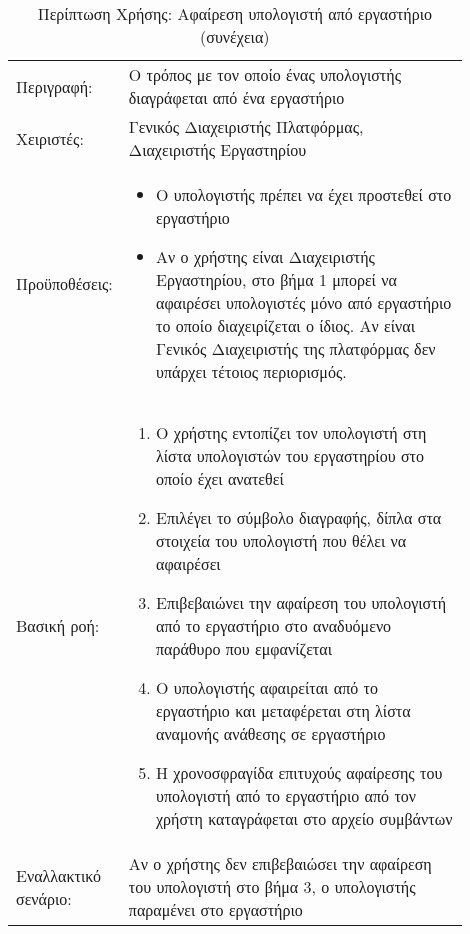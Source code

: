 %
%
\begin{longtable}{|p{0.14\linewidth}|p{0.76\linewidth}|}
	\caption{Περίπτωση Χρήσης: Αφαίρεση υπολογιστή από εργαστήριο} \label{tab:use-case-delete-computer-from-lab} \\ \hline \endfirsthead
	\caption[{}]{Περίπτωση Χρήσης: Αφαίρεση υπολογιστή από εργαστήριο (συνέχεια)} \\ \endhead \endfoot
	Περιγραφή: & Ο τρόπος με τον οποίο ένας υπολογιστής διαγράφεται από ένα εργαστήριο \\ \hline
	Χειριστές: & Γενικός Διαχειριστής Πλατφόρμας, Διαχειριστής Εργαστηρίου \\ \hline
	Προϋποθέσεις: &
	\begin{itemize}
		\vspace{-1cm}
		\addtolength{\itemindent}{-0.4cm}
		\item Ο υπολογιστής πρέπει να έχει προστεθεί στο εργαστήριο
		\item Αν ο χρήστης είναι Διαχειριστής Εργαστηρίου, στο βήμα 1 μπορεί να αφαιρέσει υπολογιστές μόνο από εργαστήριο το οποίο διαχειρίζεται ο ίδιος. Αν είναι Γενικός Διαχειριστής της πλατφόρμας δεν υπάρχει τέτοιος περιορισμός.
		\vspace{-0.7cm}
	\end{itemize} \\ \hline
	Βασική ροή: &
	\begin{enumerate}
		\vspace{-1cm}
		\addtolength{\itemindent}{-0.4cm}
		\item Ο χρήστης εντοπίζει τον υπολογιστή στη λίστα υπολογιστών του εργαστηρίου στο οποίο έχει ανατεθεί
		\item Επιλέγει το σύμβολο διαγραφής, δίπλα στα στοιχεία του υπολογιστή που θέλει να αφαιρέσει
		\item Επιβεβαιώνει την αφαίρεση του υπολογιστή από το εργαστήριο στο αναδυόμενο παράθυρο που εμφανίζεται
		\item Ο υπολογιστής αφαιρείται από το εργαστήριο και μεταφέρεται στη λίστα αναμονής ανάθεσης σε εργαστήριο
		\item Η χρονοσφραγίδα επιτυχούς αφαίρεσης του υπολογιστή από το εργαστήριο από τον χρήστη καταγράφεται στο αρχείο συμβάντων
		\vspace{-0.7cm}
	\end{enumerate} \\ \hline
	Εναλλακτικό σενάριο: & Αν ο χρήστης δεν επιβεβαιώσει την αφαίρεση του υπολογιστή στο βήμα 3, ο υπολογιστής παραμένει στο εργαστήριο \\ \hline
\end{longtable}

